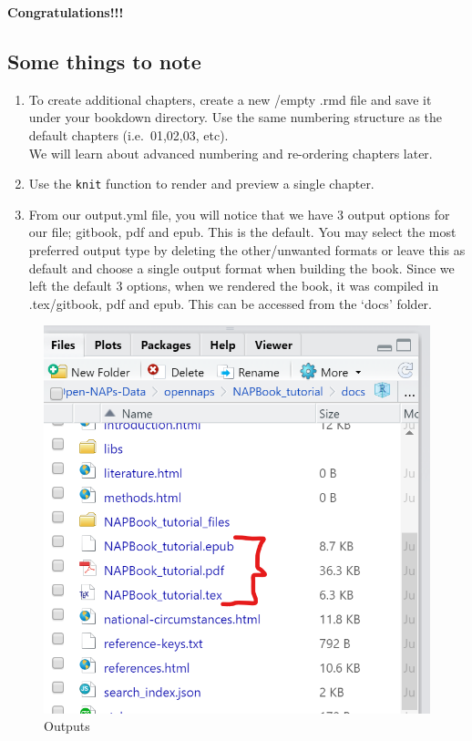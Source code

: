 \documentclass[
]{book}
\providecommand{\tightlist}{%
  \setlength{\itemsep}{0pt}\setlength{\parskip}{0pt}}
\begin{document}
\textbf{Congratulations!!!}

\hypertarget{some-things-to-note}{%
\subsection{Some things to note}\label{some-things-to-note}}

\begin{enumerate}
\def\labelenumi{\arabic{enumi}.}
\tightlist
\item
  To create additional chapters, create a new /empty .rmd file and save it under your bookdown directory. Use the same numbering structure as the default chapters (i.e.~01,02,03, etc).\\
  We will learn about advanced numbering and re-ordering chapters later.\\
\item
  Use the \texttt{knit} function to render and preview a single chapter.\\
\item
  From our output.yml file, you will notice that we have 3 output options for our file; gitbook, pdf and epub. This is the default. You may select the most preferred output type by deleting the other/unwanted formats or leave this as default and choose a single output format when building the book. Since we left the default 3 options, when we rendered the book, it was compiled in .tex/gitbook, pdf and epub. This can be accessed from the `docs' folder.
\end{enumerate}

\begin{figure}
\centering
\includegraphics{tutorial_screenshots/docs_folder_contents.png}
\caption{Outputs}
\end{figure}
\end{document}
